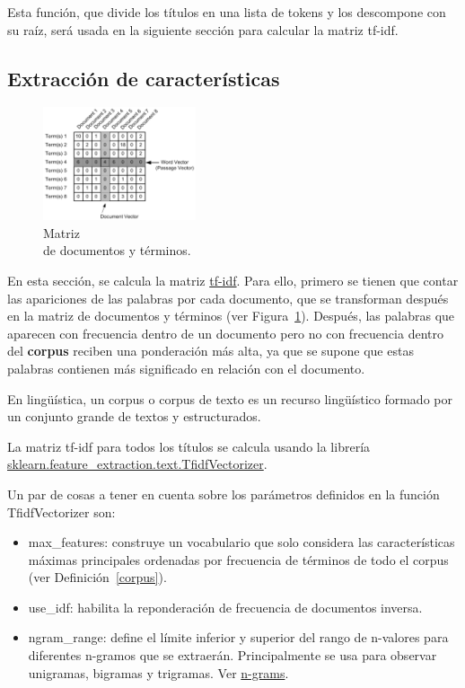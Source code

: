\documentclass{uimppracticas}
\begin{document}
Esta función, que divide los títulos en una lista de tokens y los descompone con su raíz, será usada en la siguiente sección para calcular la matriz tf-idf.
 
\subsection{Extracción de características}

\begin{figure}
	\centering
	\includegraphics[width=0.4\textwidth]{images/matrix}
	\caption{Matriz \\ de documentos y términos.}
	\label{matrix}
\end{figure}

En esta sección, se calcula la matriz \href{https://es.wikipedia.org/wiki/Tf-idf}{tf-idf}. Para ello, primero se tienen que contar las apariciones de las palabras por cada documento, que se transforman después en la matriz de documentos y términos (ver Figura~\ref{matrix}). Después, las palabras que aparecen con frecuencia dentro de un documento pero no con frecuencia dentro del \textbf{corpus} reciben una ponderación más alta, ya que se supone que estas palabras contienen más significado en relación con el documento.

\begin{definition}\label{corpus}
En lingüística, un corpus o corpus de texto es un recurso lingüístico formado por un conjunto grande de textos y estructurados.
\end{definition}


La matriz tf-idf para todos los títulos se calcula usando la librería \href{https://scikit-learn.org/stable/modules/generated/sklearn.feature_extraction.text.TfidfVectorizer.html}{sklearn.feature\_extraction.text.TfidfVectorizer}. 

Un par de cosas a tener en cuenta sobre los parámetros definidos en la función TfidfVectorizer son:

\begin{itemize}
	\item max\_features: construye un vocabulario que solo considera las características máximas principales ordenadas por frecuencia de términos de todo el corpus (ver Definición~\ref{corpus}).
	\item use\_idf: habilita la reponderación de frecuencia de documentos inversa.
	\item ngram\_range: define el límite inferior y superior del rango de n-valores para diferentes n-gramos que se extraerán. Principalmente se usa para observar unigramas, bigramas y trigramas. Ver \href{https://en.wikipedia.org/wiki/N-gram}{n-grams}.
\end{itemize}
\end{document}
